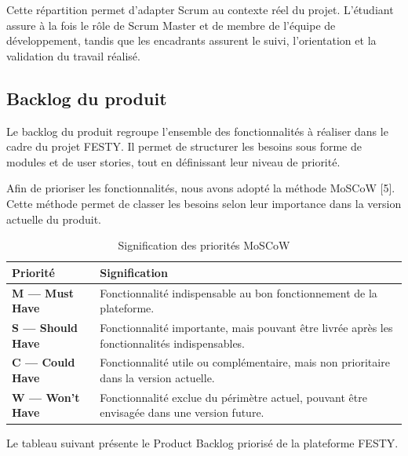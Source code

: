 Cette répartition permet d’adapter Scrum au contexte réel du projet. L’étudiant assure à la fois le rôle de Scrum Master et de membre de l’équipe de développement, tandis que les encadrants assurent le suivi, l’orientation et la validation du travail réalisé.


\subsection{Backlog du produit}


Le backlog du produit regroupe l’ensemble des fonctionnalités à réaliser dans le cadre du projet FESTY. Il permet de structurer les besoins sous forme de modules et de user stories, tout en définissant leur niveau de priorité.


Afin de prioriser les fonctionnalités, nous avons adopté la méthode MoSCoW [5]. Cette méthode permet de classer les besoins selon leur importance dans la version actuelle du produit.


\begin{table}[H]
\centering
\caption{Signification des priorités MoSCoW}
\label{tableau:2-5}
\renewcommand{\arraystretch}{1.2}
\begin{tabularx}{\textwidth}{|>{\raggedright\arraybackslash}X|>{\raggedright\arraybackslash}X|}
\hline
\rowcolor[HTML]{ECF4FF}
\textbf{Priorité} & \textbf{Signification} \\
\hline
\textbf{M — Must Have} & Fonctionnalité indispensable au bon fonctionnement de la plateforme. \\
\hline
\textbf{S — Should Have} & Fonctionnalité importante, mais pouvant être livrée après les fonctionnalités indispensables. \\
\hline
\textbf{C — Could Have} & Fonctionnalité utile ou complémentaire, mais non prioritaire dans la version actuelle. \\
\hline
\textbf{W — Won’t Have} & Fonctionnalité exclue du périmètre actuel, pouvant être envisagée dans une version future. \\
\hline
\end{tabularx}
\end{table}


Le tableau suivant présente le Product Backlog priorisé de la plateforme FESTY.


